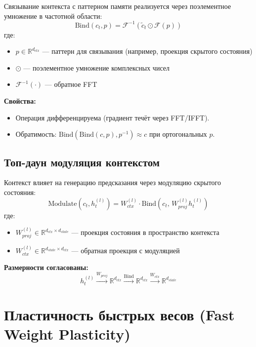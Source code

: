 Связывание контекста с паттерном памяти реализуется через поэлементное умножение в частотной области:
\begin{equation}
\text{Bind}(c_t, p) = \mathcal{F}^{-1}\left(\tilde{c}_t \odot \mathcal{F}(p)\right)
\label{eq:binding}
\end{equation}
где:
\begin{itemize}
    \item $p \in \mathbb{R}^{d_{ctx}}$ — паттерн для связывания (например, проекция скрытого состояния)
    \item $\odot$ — поэлементное умножение комплексных чисел
    \item $\mathcal{F}^{-1}(\cdot)$ — обратное FFT
\end{itemize}

\textbf{Свойства:}
\begin{itemize}
    \item Операция дифференцируема (градиент течёт через FFT/IFFT).
    \item Обратимость: $\text{Bind}(\text{Bind}(c, p), p^{-1}) \approx c$ при ортогональных $p$.
\end{itemize}

\subsection{Топ-даун модуляция контекстом}

Контекст влияет на генерацию предсказания через модуляцию скрытого состояния:
\begin{equation}
\text{Modulate}(c_t, h_t^{(l)}) = W_{ctx}^{(l)} \cdot \text{Bind}(c_t, \, W_{proj}^{(l)} h_t^{(l)})
\label{eq:modulation}
\end{equation}
где:
\begin{itemize}
    \item $W_{proj}^{(l)} \in \mathbb{R}^{d_{ctx} \times d_{state}}$ — проекция состояния в пространство контекста
    \item $W_{ctx}^{(l)} \in \mathbb{R}^{d_{state} \times d_{ctx}}$ — обратная проекция с модуляцией
\end{itemize}

\textbf{Размерности согласованы:}
\[
h_t^{(l)} \xrightarrow{W_{proj}} \mathbb{R}^{d_{ctx}} \xrightarrow{\text{Bind}} \mathbb{R}^{d_{ctx}} \xrightarrow{W_{ctx}} \mathbb{R}^{d_{state}}
\]

\section{Пластичность быстрых весов (Fast Weight Plasticity)}

